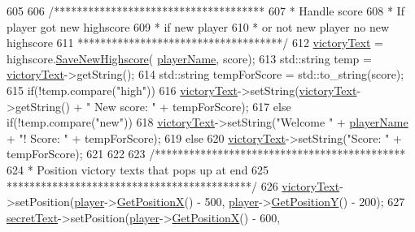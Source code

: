 \begin{DoxyCode}
605 
606         \textcolor{comment}{/*************************************}
607 \textcolor{comment}{         * Handle score}
608 \textcolor{comment}{         * If player got new highscore}
609 \textcolor{comment}{         * if new player}
610 \textcolor{comment}{         * or not new player no new highscore}
611 \textcolor{comment}{         ************************************/}
612         \hyperlink{classTestApp_a11b6f78ad8d0e5eaf77971cbf8cbe723}{victoryText} = highscore.\hyperlink{classHighscore_a4b041465e4a5d91f5eba7ce9c911b66a}{SaveNewHighscore}(
      \hyperlink{classTestApp_a0e02b27103439e2947632007ad9fe122}{playerName}, score);
613         std::string temp = \hyperlink{classTestApp_a11b6f78ad8d0e5eaf77971cbf8cbe723}{victoryText}->getString();
614         std::string tempForScore = std::to\_string(score);
615         \textcolor{keywordflow}{if}(!temp.compare(\textcolor{stringliteral}{"high"}))
616             \hyperlink{classTestApp_a11b6f78ad8d0e5eaf77971cbf8cbe723}{victoryText}->setString(\hyperlink{classTestApp_a11b6f78ad8d0e5eaf77971cbf8cbe723}{victoryText}->getString() + \textcolor{stringliteral}{" New score: "} + 
      tempForScore);
617         \textcolor{keywordflow}{else} \textcolor{keywordflow}{if}(!temp.compare(\textcolor{stringliteral}{"new"}))
618             \hyperlink{classTestApp_a11b6f78ad8d0e5eaf77971cbf8cbe723}{victoryText}->setString(\textcolor{stringliteral}{"Welcome "} + \hyperlink{classTestApp_a0e02b27103439e2947632007ad9fe122}{playerName} + \textcolor{stringliteral}{"! Score: "} + 
      tempForScore);
619         \textcolor{keywordflow}{else}
620             \hyperlink{classTestApp_a11b6f78ad8d0e5eaf77971cbf8cbe723}{victoryText}->setString(\textcolor{stringliteral}{"Score: "} + tempForScore);
621 
622 
623         \textcolor{comment}{/********************************************}
624 \textcolor{comment}{         * Position victory texts that pops up at end}
625 \textcolor{comment}{         *******************************************/}
626         \hyperlink{classTestApp_a11b6f78ad8d0e5eaf77971cbf8cbe723}{victoryText}->setPosition(\hyperlink{classTestApp_a72c21fba56a65699606328b9e765d6db}{player}->\hyperlink{classPlayerObject_aa84a7779304b680fa32b88b01ba95d02}{GetPositionX}() - 500, 
      \hyperlink{classTestApp_a72c21fba56a65699606328b9e765d6db}{player}->\hyperlink{classPlayerObject_ad17b9ec44299f4dc9ca20064c883496b}{GetPositionY}() - 200);
627         \hyperlink{classTestApp_a9ec0950ad6b860a2e88a9450811afcb1}{secretText}->setPosition(\hyperlink{classTestApp_a72c21fba56a65699606328b9e765d6db}{player}->\hyperlink{classPlayerObject_aa84a7779304b680fa32b88b01ba95d02}{GetPositionX}() - 600, 

\end{DoxyCode}
